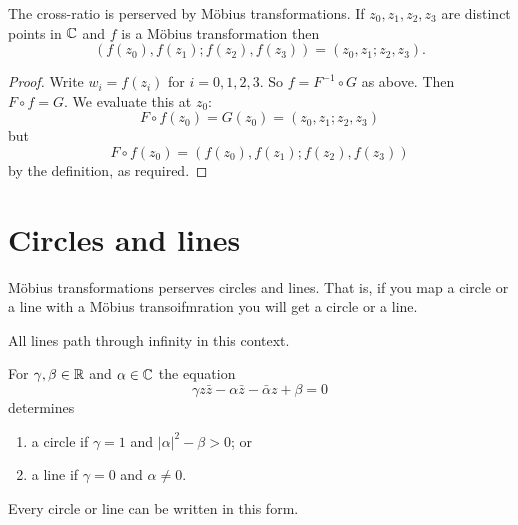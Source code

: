 \begin{proposition}
    The cross-ratio is perserved by M\"obius transformations. If $z_0, z_1, z_2, z_3$ are distinct points in $\mathbb{C}$ and $f$ is a M\"obius transformation then
    \[ (f(z_0), f(z_1); f(z_2), f(z_3)) = (z_0, z_1; z_2, z_3). \]
\end{proposition}

\begin{proof}
    Write $w_i = f(z_i)$ for $i = 0, 1, 2, 3$. So $f = F^{-1} \circ G$ as above. Then $F \circ f = G$. We evaluate this at $z_0$:
    \[ F \circ f(z_0) = G(z_0) = (z_0, z_1; z_2, z_3) \]
    but 
    \[ F \circ f(z_0) = (f(z_0), f(z_1); f(z_2), f(z_3)) \]
    by the definition, as required.
\end{proof}

\section{Circles and lines}

\begin{proposition}[]
    \label{prop:mob-circles-lines}
    M\"obius transformations perserves circles and lines. That is, if you map a circle or a line with a M\"obius transoifmration you will get a circle or a line.
\end{proposition}

\begin{remark}
    All lines path through infinity in this context.
\end{remark}

\begin{lemma}[]
    For $\gamma, \beta \in \mathbb{R}$ and $\alpha \in \mathbb{C}$ the equation 
    \[ \gamma z \bar z - \alpha \bar z - \bar \alpha z + \beta = 0 \]
    determines
    \begin{enumerate}
        \item a circle if $\gamma = 1$ and $\lvert \alpha \rvert^2 - \beta > 0$; or
        \item a line if $\gamma = 0$ and $\alpha \neq 0$.
    \end{enumerate}
    Every circle or line can be written in this form.
\end{lemma}

